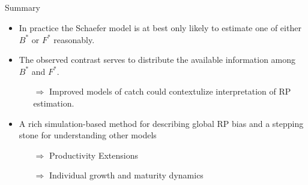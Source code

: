 \documentclass[ xcolor = pdftex, dvipsnames, table ]{beamer}
\begin{document}
\subsection{}
%
\begin{frame}{Summary}
%
\begin{itemize}	
	\item In practice the Schaefer model is at best only likely to estimate one of either $B^*$ or $F^*$ reasonably.
	\item The observed contrast serves to distribute the available information among $B^*$ and $F^*$. 
	\begin{itemize}
		\item[$\Rightarrow$] Improved models of catch could contextulize interpretation of RP estimation.  
	\end{itemize}
	\item A rich simulation-based method for describing global RP bias and a stepping stone for understanding other models	
	\begin{itemize}
                \item[$\Rightarrow$] Productivity Extensions
                \item[$\Rightarrow$] Individual growth and maturity dynamics
        \end{itemize}
\end{itemize}
\end{frame}
\end{document}
